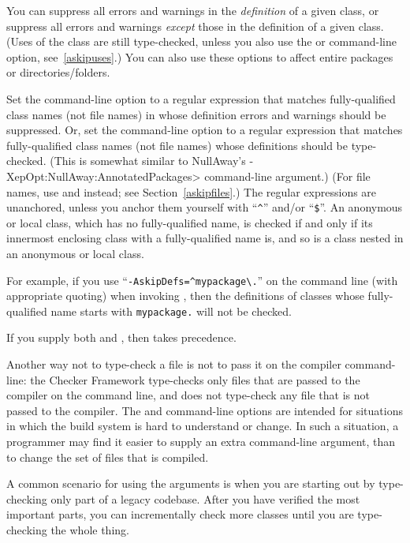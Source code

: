 
You can suppress all errors and warnings in the \emph{definition} of a given
class, or suppress all errors and warnings \emph{except} those in the definition
of a given class.  (Uses of the class are still type-checked, unless you also use
the  or  command-line option,
see~\ref{askipuses}.)
You can also use these options to affect entire packages or directories/folders.

Set the  command-line option to a
regular expression that matches fully-qualified class names (not file names) in whose definition errors and warnings
should be suppressed.
Or, set the  command-line option to a
regular expression that matches fully-qualified class names (not file names) whose
definitions should be type-checked.
(This is somewhat similar to NullAway's
\<-XepOpt:NullAway:AnnotatedPackages> command-line argument.)
(For file names, use  and  instead; see
Section~\ref{askipfiles}.)
The regular expressions are unanchored, unless you anchor them yourself
with ``\codesize\verb|^|'' and/or ``\codesize\verb|$|''.
An anonymous or local class, which has no fully-qualified name, is checked if
and only if its innermost enclosing class with a fully-qualified name is, and
so is a class nested in an anonymous or local class.

For example, if you use
``{\codesize\verb|-AskipDefs=^mypackage\.|}'' on the command line
(with appropriate quoting) when invoking
, then the definitions of
classes whose fully-qualified name starts with \codesize\verb|mypackage.|
will not be checked.

If you supply both  and , then
 takes precedence.

Another way not to type-check a file is not to pass it on the compiler
command-line:  the Checker Framework type-checks only files that are passed
to the compiler on the command line, and does not type-check any file that
is not passed to the compiler.  The  and 
command-line options
are intended for situations in which the build system is hard to understand
or change.  In such a situation, a programmer may find it easier to supply
an extra command-line argument, than to change the set of files that is
compiled.

A common scenario for using the arguments is when you are starting out by
type-checking only part of a legacy codebase.  After you have verified the
most important parts, you can incrementally check more classes until you
are type-checking the whole thing.


